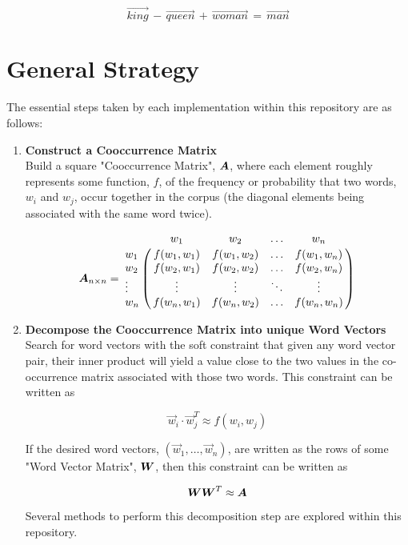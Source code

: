 \documentclass{article}
\begin{document}
\begin{equation*}
\vec{king} \, - \, \vec{queen} \, + \, \vec{woman} \, = \, \vec{man}
\end{equation*}
%
%

\section{General Strategy}
The essential steps taken by each implementation within this repository are as follows: 

\begin{enumerate}
	\item 
		\textbf{Construct a Cooccurrence Matrix}\\
		Build a square "Cooccurrence Matrix", $\boldsymbol{A}$, where each element roughly represents some function, $f$, of the frequency or probability that two words, $w_i$ and $w_j$, occur together in the corpus (the diagonal elements being associated with the same word twice).
		
		\begin{equation*}
		\mat{A}{n}{n}=
		\bordermatrix{	&	w_1			&	w_2			& \ldots &	w_n			\cr
                w_1 	& f(w_1,w_1) 	&  f(w_1,w_2)   & \ldots & f(w_1,w_n) 	\cr
                w_2 	& f(w_2,w_1) 	&  f(w_2,w_2) 	& \ldots & f(w_2,w_n) 	\cr
                \vdots	& \vdots 		& \vdots 		& \ddots & \vdots		\cr
                w_n		& f(w_n,w_1)  	&  f(w_n,w_2)   & \ldots & f(w_n,w_n) 	}
		\end{equation*}
	\item 
		\textbf{Decompose the Cooccurrence Matrix into unique Word Vectors}\\
		Search for word vectors with the soft constraint that given any word vector pair, their inner product will yield a value close to the two values in the co-occurrence matrix associated with those two words. This constraint can be written as
		
		\begin{equation*}
			\vec{w}_{i} \cdot \vec{w}_{j}^T \approx f(w_i,w_j)
		\end{equation*}
		
		If the desired word vectors, $\left( \vec{w}_{1}, \ldots, \vec{w}_{n} \right)$, are written as the rows of some "Word Vector Matrix", $\boldsymbol{W}$, then this constraint can be written as
		
		\begin{equation*}
			\boldsymbol{W}\boldsymbol{W}^T \approx \boldsymbol{A}
		\end{equation*}
		
		Several methods to perform this decomposition step are explored within this repository. 
\end{enumerate}
\end{document}
